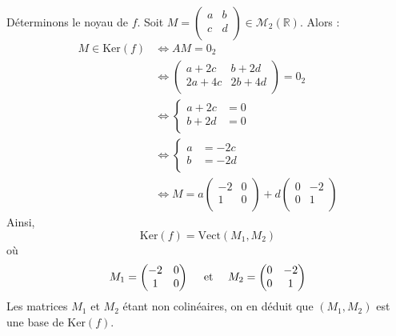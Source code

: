 \documentclass[a4paper,10pt]{report}
\begin{document}
\begin{enumerate}
\noindent Déterminons le noyau de $f$. Soit $M = \begin{pmatrix}
a&b \\
c & d \\
\end{pmatrix} \in \mathcal{M}_2(\mathbb{R})$. Alors :
\begin{align*}
M \in \textrm{Ker}(f) & \Longleftrightarrow  AM = 0_2 \\
& \Longleftrightarrow \begin{pmatrix}
a+2c & b+2d \\
2a+4c & 2b+4d \\
\end{pmatrix} = 0_2 \\
& \Longleftrightarrow \left\lbrace \begin{array}{cl}
a+2c & = 0 \\
b+2d & = 0 \\
\end{array}\right. \\
& \Longleftrightarrow \left\lbrace \begin{array}{cl}
a& = -2c \\
b & = -2d \\
\end{array}\right. \\
& \Longleftrightarrow  M = a \begin{pmatrix}
-2 & 0 \\
1 & 0 \\
\end{pmatrix} + d \begin{pmatrix}
0 & -2 \\
0 & 1 \\
\end{pmatrix}
\end{align*}
Ainsi,
$$ \textrm{Ker}(f) = \textrm{Vect}(M_1,M_2)$$
où
$$ M_1 = \begin{pmatrix}
-2 & 0 \\
1 & 0 \\
\end{pmatrix} \quad \hbox{ et } \quad M_2 = \begin{pmatrix}
0 & -2 \\
0 & 1 \\
\end{pmatrix}$$
Les matrices $M_1$ et $M_2$ étant non colinéaires, on en déduit que $(M_1,M_2)$ est une base de $\textrm{Ker}(f)$.

\medskip


\end{enumerate}
\end{document}
